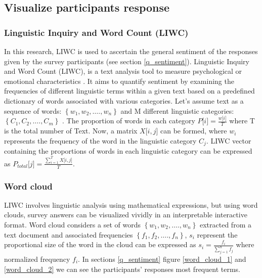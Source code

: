 \documentclass[sn-mathphys,Numbered]{sn-jnl}%
\theoremstyle{thmstyleone}%
\theoremstyle{thmstyletwo}%
\theoremstyle{thmstylethree}%
\begin{document}
\subsection{Visualize participants response}\label{vis_part} 

\subsubsection{Linguistic Inquiry and Word Count (LIWC)} \label{liwc}
In this research, LIWC is used to ascertain the general sentiment of the responses given by the survey participants (see section \ref{q_sentiment}). Linguistic Inquiry and Word Count (LIWC), is a text analysis tool to measure psychological or emotional characteristics \cite{tausczik2010psychological, liwc22_welcome_nodate}. It aims to quantify sentiment by examining the frequencies of different linguistic terms within a given text based on a predefined dictionary of words associated with various categories. Let's assume text as a sequence of words: \(\left\{ w_{1},w_{2},\ldots.,w_{n} \right\}\) and M different linguistic categories: \(\left\{ C_{1},C_{2},\ldots.,C_{m} \right\}\) . The proportion of words in each category \(P\lbrack i\rbrack = \frac{w\lbrack i\rbrack}{T}\) where T is the total number of Text. Now, a matrix \(X\lbrack i,j\rbrack\) can be formed, where \(w_{i}\) represents the frequency of the word in the linguistic category \(C_{j}\). LIWC vector containing the proportions of words in each linguistic category can be expressed as \(P_{total}\lbrack j\rbrack = \frac{\sum_{i = 1}^{T}{X\lbrack i,j\rbrack}}{T}\).\\

\subsubsection{Word cloud} \label{wordcloud} LIWC involves linguistic analysis using mathematical expressions, but using word clouds, survey answers can be visualized vividly in an interpretable interactive format. Word cloud considers a set of words \(\left\{ w_{1},w_{2},\ldots.,w_{n} \right\}\) extracted from a text document and associated frequencies \(\left\{ f_{1},f_{2},\ldots.,f_{n} \right\}\), \(s_{i}\) represent the proportional size of the word in the cloud can be expressed as \(s_{i} = \frac{f_{i}}{\sum_{j = 1}^{n}f_{j}}\) where normalized frequency \(f_{i}\). In sections \ref{q_sentiment} figure \ref{word_cloud_1} and \ref{word_cloud_2} we can see the participants' responses most frequent terms.\\
\end{document}

